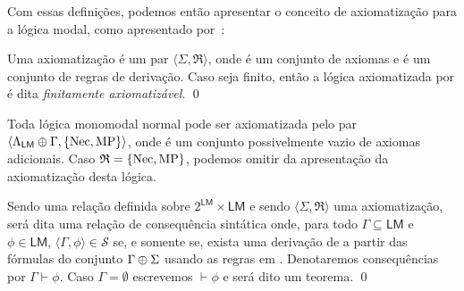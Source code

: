         Com essas definições, podemos então apresentar o conceito de axiomatização para a lógica modal, como apresentado por~:

        \begin{definicao}
            Uma axiomatização é um par \(\langle\Sigma, \mathfrak{R}\rangle\), onde \SIGMA é um conjunto de axiomas e  é um conjunto
            de regras de derivação. Caso \SIGMA seja finito, então a lógica axiomatizada por \SIGMA é dita \textit{finitamente axiomatizável}. \qed
        \end{definicao}

        Toda lógica monomodal normal pode ser axiomatizada pelo par \(\langle\Lambda_{\mathsf{LM}} \mathbin{\oplus} \Gamma, \{\operatorname{Nec}, \operatorname{MP}\}\rangle\),
        onde \GAMMA é um conjunto possivelmente vazio de axiomas adicionais. Caso \(\mathfrak{R} = \{\operatorname{Nec}, \operatorname{MP}\}\),
        podemos omitir  da apresentação da axiomatização desta lógica.%

        \begin{definicao}
            Sendo  uma relação definida sobre \(2^{\mathsf{LM}} \times \mathsf{LM}\) e sendo \(\langle \Sigma, \mathfrak{R}\rangle\) uma axiomatização,
             será dita uma relação de consequência sintática onde, para todo \(\Gamma \subseteq \mathsf{LM}\) e \(\phi \in \mathsf{LM}\),
            \(\langle \Gamma, \phi \rangle \in \mathord{\mathcal{S}}\) se, e somente se, exista uma derivação de \PHI a partir das fórmulas
            do conjunto \(\Gamma \mathbin{\oplus} \Sigma\) usando as regras em .
            Denotaremos consequências por \(\Gamma \vdash \phi\). Caso \(\Gamma = \emptyset\) escrevemos \(\vdash \phi\) e
            \PHI será dito um teorema. \qed
        \end{definicao}


